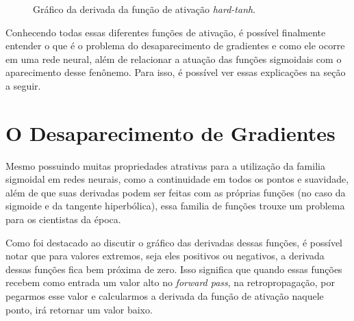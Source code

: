 \begin{figure}[h!]
    \centering
    \caption{Gráfico da derivada da função de ativação \textit{hard-tanh}.}
    \label{fig:hard-tanh-derivada}
\end{figure}

Conhecendo todas essas diferentes funções de ativação, é possível finalmente entender o que é o problema do desaparecimento de gradientes e como ele ocorre em uma rede neural, além de relacionar a atuação das funções sigmoidais com o aparecimento desse fenônemo. Para isso, é possível ver essas explicações na seção a seguir.

\section{O Desaparecimento de Gradientes}

Mesmo possuindo muitas propriedades atrativas para a utilização da familia sigmoidal em redes neurais, como a continuidade em todos os pontos e suavidade, além de que suas derivadas podem ser feitas com as próprias funções (no caso da sigmoide e da tangente hiperbólica), essa familia de funções trouxe um problema para os cientistas da época.

Como foi destacado ao discutir o gráfico das derivadas dessas funções, é possível notar que para valores extremos, seja eles positivos ou negativos, a derivada dessas funções fica bem próxima de zero. Isso significa que quando essas funções recebem como entrada um valor alto no \textit{forward pass}, na retropropagação, por pegarmos esse valor e calcularmos a derivada da função de ativação naquele ponto, irá retornar um valor baixo.


